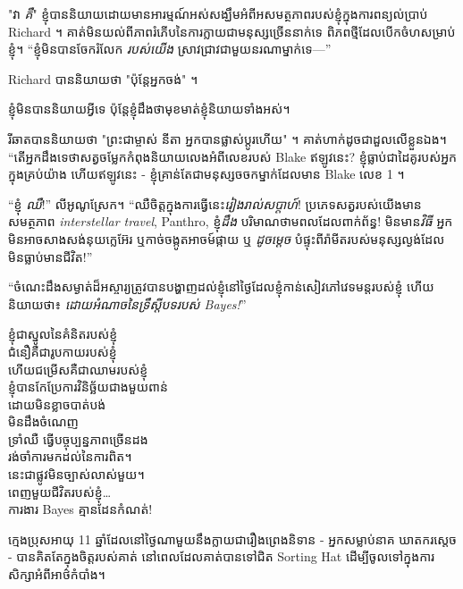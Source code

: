 "វា \emph{គឺ}" ខ្ញុំបាននិយាយដោយមានអារម្មណ៍អស់សង្ឃឹមអំពីអសមត្ថភាពរបស់ខ្ញុំក្នុងការពន្យល់ប្រាប់ Richard ។ គាត់​មិន​យល់​ពី​ភាព​រំភើប​នៃ​ការ​ក្លាយ​ជា​មនុស្ស​ច្រើន​នាក់​ទេ ពិភព​ថ្មី​ដែល​បើក​ចំហ​សម្រាប់​ខ្ញុំ។ “ខ្ញុំមិនបានចែករំលែក \emph{របស់យើង} ស្រាវជ្រាវជាមួយនរណាម្នាក់ទេ—”

Richard បាននិយាយថា "ប៉ុន្តែអ្នកចង់" ។

ខ្ញុំ​មិន​បាន​និយាយ​អ្វី​ទេ ប៉ុន្តែ​ខ្ញុំ​ដឹង​ថា​មុខ​មាត់​ខ្ញុំ​និយាយ​ទាំង​អស់។

រីឆាតបាននិយាយថា "ព្រះជាម្ចាស់ នីតា អ្នកបានផ្លាស់ប្តូរហើយ" ។ គាត់ហាក់ដូចជាដួលលើខ្លួនឯង។ “តើ​អ្នក​ដឹង​ទេ​ថា​សត្វ​ចម្លែក​កំពុង​និយាយ​លេង​អំពី​លេខ​របស់ Blake ឥឡូវនេះ? ខ្ញុំធ្លាប់ជាដៃគូរបស់អ្នកក្នុងគ្រប់យ៉ាង ហើយឥឡូវនេះ - ខ្ញុំគ្រាន់តែជាមនុស្សចចកម្នាក់ដែលមាន Blake លេខ 1 ។


“ខ្ញុំ \emph{ឈឺ}!” លីអូណូស្រែក។ “ឈឺចិត្តក្នុងការធ្វើនេះ\emph{រៀងរាល់សប្តាហ៍}! ប្រភេទសត្វរបស់យើងមានសមត្ថភាព \emph{interstellar travel}, Panthro, ខ្ញុំ\emph{ដឹង} បរិមាណថាមពលដែលពាក់ព័ន្ធ! មិនមាន\emph{វិធី} អ្នកមិនអាចសាងសង់នុយក្លេអ៊ែរ ឬកាច់ចង្កូតអាចម៍ផ្កាយ ឬ \emph{ដូចម្ដេច} បំផ្ទុះពីរ៉ាមីតរបស់មនុស្សល្ងង់ដែលមិនធ្លាប់មានជីវិត!”

\clearpage
{}

“ចំណេះដឹងសម្ងាត់ដ៏អស្ចារ្យត្រូវបានបង្ហាញដល់ខ្ញុំនៅថ្ងៃដែលខ្ញុំកាន់សៀវភៅវេទមន្តរបស់ខ្ញុំ ហើយនិយាយថា៖ \emph{ដោយអំណាចនៃទ្រឹស្តីបទរបស់ Bayes!}”


\begin{emph}
ខ្ញុំជាស្នូលនៃគំនិតរបស់ខ្ញុំ\\
ជំនឿគឺជារូបកាយរបស់ខ្ញុំ\\
ហើយជម្រើសគឺជាឈាមរបស់ខ្ញុំ \\
ខ្ញុំបានកែប្រែការវិនិច្ឆ័យជាងមួយពាន់\\
ដោយមិនខ្លាចបាត់បង់\\
មិនដឹងចំណេញ \\
ទ្រាំឈឺ ធ្វើបច្ចុប្បន្នភាពច្រើនដង\\
រង់ចាំការមកដល់នៃការពិត។\\
នេះជាផ្លូវមិនច្បាស់លាស់មួយ។\\
ពេញមួយជីវិតរបស់ខ្ញុំ…\\
ការងារ Bayes គ្មានដែនកំណត់!
\end{emph}


ក្មេងប្រុសអាយុ 11 ឆ្នាំដែលនៅថ្ងៃណាមួយនឹងក្លាយជារឿងព្រេងនិទាន - អ្នកសម្លាប់នាគ ឃាតករស្តេច - បានគិតតែក្នុងចិត្តរបស់គាត់ នៅពេលដែលគាត់បានទៅជិត Sorting Hat ដើម្បីចូលទៅក្នុងការសិក្សាអំពីអាថ៌កំបាំង។

